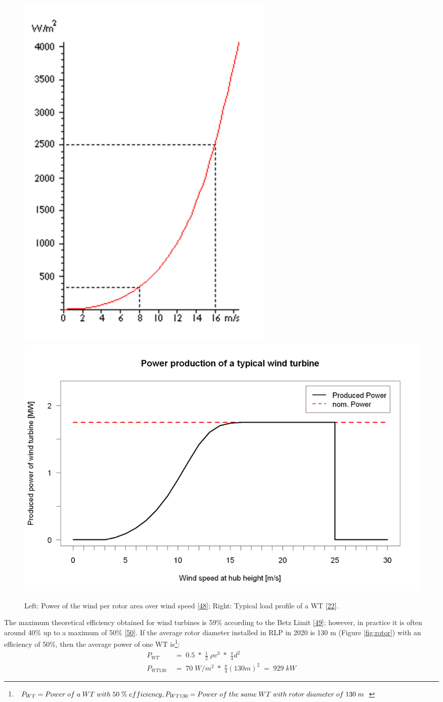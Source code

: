 \documentclass[a4paper,11pt]{article}
\begin{document}
\begin{figure}

{\centering \includegraphics[width=0.49\linewidth,height=0.25\textheight]{figures/power2} \includegraphics[width=0.49\linewidth,height=0.25\textheight]{figures/powercurve} 

}

\caption{Left: Power of the wind per rotor area over wind speed {[}\protect\hyperlink{ref-DanishWindIndutryAssociation.2003}{48}{]}; Right: Typical load profile of a WT {[}\protect\hyperlink{ref-Wikipedia.2021}{22}{]}.}\label{fig:powerofwind}
\end{figure}
The maximum theoretical efficiency obtained for wind turbines is 59\% according to the Betz Limit {[}\protect\hyperlink{ref-A.Betz.1920}{49}{]}; however, in practice it is often around 40\% up to a maximum of 50\% {[}\protect\hyperlink{ref-WindwartsEnergieausdemNorden.2021}{50}{]}. If the average rotor diameter installed in RLP in 2020 is 130 m (Figure \ref{fig:rotor}) with an efficiency of 50\%, then the average power of one WT is\footnote{\(P_{WT}=Power\; of\; a\; WT\; with\; 50\; \%\; efficiency,\;\\ P_{WT130}=Power\; of\; the\; same\; WT\; with\; rotor\; diameter\; of\; 130\; m\)}:
\begin{equation}
\begin{split}
P_{WT}\; & =\; 0.5\; *\; \frac{1}{2}\; \rho v^3\; *\; \frac{\pi}{4}d^2 \\
P_{WT130}\; & =\; 70\; W/m^2\; *\; \frac{\pi}{4}(130 m)^2\; =\; 929\; kW
\end{split}
\end{equation}
\end{document}
